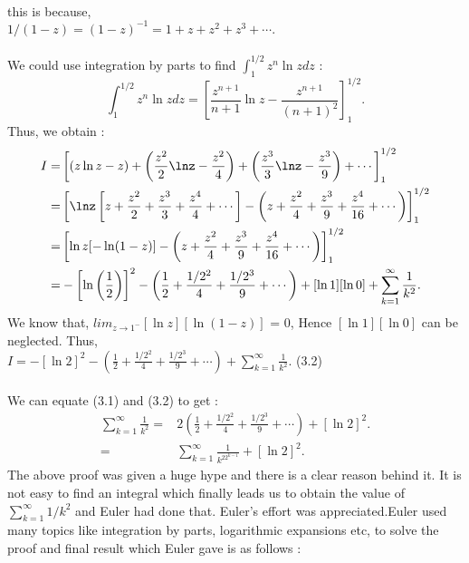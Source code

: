 \documentclass[a4paper,reqno,11pt]{book}
\theoremstyle{plain}%
\theoremstyle{definition}
\begin{document}
\\
this is because,\\$1/(1-z) = (1-z)^{-1} = 1 + z + z^2 + z^3 + \cdots.$\\
\\
We could use integration by parts to find $\int_{1}^{1/2}z^n\ln zdz$ :\\
$$\int_{1}^{1/2}z^n\ln zdz = \left[\frac{z^{n+1}}{n+1}\ln z - \frac{z^{n+1}}{(n+1)^2}\right]_1^{1/2}.$$
Thus, we obtain :
\begin{align*}
I =&  \left[(z\ln z - z) + \left(\frac{z^2}{2}\lnz - \frac{z^2}{4}\right) + \left(\frac{z^3}{3}\lnz - \frac{z^3}{9}\right) + \cdots\right]_1^{1/2}\\
=& \left[\lnz\left[z + \frac{z^2}{2} + \frac{z^3}{3} + \frac{z^4}{4} + \cdots\right] - \left(z + \frac{z^2}{4} + \frac{z^3}{9} + \frac{z^4}{16} + \cdots\right)\right]_1^{1/2}\\
=& \left[\ln z[-\ln(1-z)] - \left(z + \frac{z^2}{4} + \frac{z^3}{9} + \frac{z^4}{16} + \cdots\right)\right]_1^{1/2}\\
=& -\left[\ln\left(\frac{1}{2}\right)\right]^2 - \left(\frac{1}{2} + \frac{1/2^2}{4} + \frac{1/2^3}{9} + \cdots\right) + [\ln1][\ln0] + \sum_{k=1}^{\infty}\frac{1}{k^2}.
\end{align*}
We know that, $lim_{z\to1^-}[\ln z][\ln(1-z)]$ = 0, Hence $[\ln1][\ln0]$ can be neglected. Thus,\\
$I = -[\ln2]^2 - \left(\frac{1}{2} + \frac{1/2^2}{4} + \frac{1/2^3}{9} + \cdots\right) + \sum_{k=1}^{\infty}\frac{1}{k^2}.$ \hspace{3cm} (3.2)\\
\\
We can equate (3.1) and (3.2) to get :\\
\begin{align*}
\sum_{k=1}^{\infty}\frac{1}{k^2} =& 2\left(\frac{1}{2} + \frac{1/2^2}{4} + \frac{1/2^3}{9} + \cdots\right) + [\ln2]^2. \\
=& \sum_{k=1}^{\infty}\frac{1}{k^22^{k-1}}  + [\ln2]^2.
\end{align*}
The above proof was given a huge hype and there is a clear reason behind it. It is not easy to find an integral which finally leads us to obtain the value of $\sum_{k=1}^{\infty}1/k^2$ and Euler had done that. Euler's effort was appreciated.Euler used many topics like integration by parts, logarithmic expansions etc, to solve the proof and final result which Euler gave is as follows :
\end{document}
